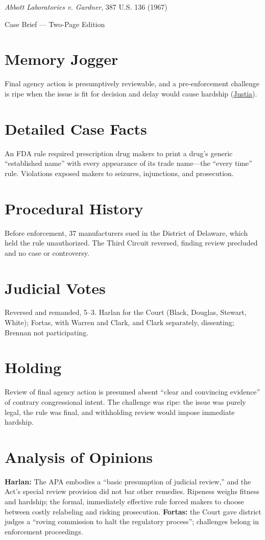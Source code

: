 \documentclass[12pt]{article}
\begin{document}
\begin{center}
{\LARGE \textit{Abbott Laboratories v. Gardner}, 387 U.S. 136 (1967)\par}
\vspace{0.5em}
{\large Case Brief --- Two-Page Edition\par}
\end{center}

\section{Memory Jogger}
Final agency action is presumptively reviewable, and a pre-enforcement challenge is ripe when the issue is fit for decision and delay would cause hardship (\href{https://supreme.justia.com/cases/federal/us/387/136/}{Justia}).

\section{Detailed Case Facts}
An FDA rule required prescription drug makers to print a drug's generic ``established name'' with every appearance of its trade name---the ``every time'' rule. Violations exposed makers to seizures, injunctions, and prosecution.

\section{Procedural History}
Before enforcement, 37 manufacturers sued in the District of Delaware, which held the rule unauthorized. The Third Circuit reversed, finding review precluded and no case or controversy.

\section{Judicial Votes}
Reversed and remanded, 5--3. Harlan for the Court (Black, Douglas, Stewart, White); Fortas, with Warren and Clark, and Clark separately, dissenting; Brennan not participating.

\section{Holding}
Review of final agency action is presumed absent ``clear and convincing evidence'' of contrary congressional intent. The challenge was ripe: the issue was purely legal, the rule was final, and withholding review would impose immediate hardship.

\section{Analysis of Opinions}
\textbf{Harlan:} The APA embodies a ``basic presumption of judicial review,'' and the Act's special review provision did not bar other remedies. Ripeness weighs fitness and hardship; the formal, immediately effective rule forced makers to choose between costly relabeling and risking prosecution. \textbf{Fortas:} the Court gave district judges a ``roving commission to halt the regulatory process''; challenges belong in enforcement proceedings.
\end{document}
